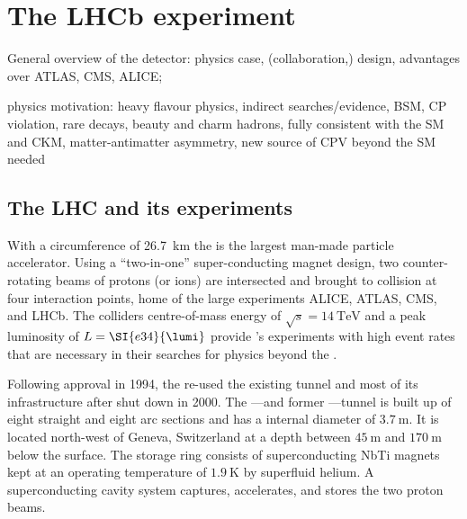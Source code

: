 
\chapter{The \acs*{LHCb} experiment}
\label{ch:lhcb_experiment}
General overview of the detector: physics case, (collaboration,) design, advantages over ATLAS, CMS, ALICE; 

physics motivation:
heavy flavour physics, indirect searches/evidence, BSM, CP violation, rare decays, beauty and charm hadrons, fully consistent with the SM and CKM, matter-antimatter asymmetry, new source of CPV beyond the SM needed

\section{The \acs*{LHC} and its experiments}
\label{sec:lhcb_experiment:lhc}

With a circumference of \SI{26.7}{\kilo\metre} the \LHC is the largest man-made
particle accelerator. Using a \enquote{two-in-one} super-conducting magnet
design, two counter-rotating beams of protons (or ions) are intersected and
brought to collision at four interaction points, home of the large \LHC
experiments \acs*{ALICE}, \acs*{ATLAS}, \acs*{CMS}, and \acs*{LHCb}. The
colliders centre-of-mass energy of $\sqrt{s}=\SI{14}{\TeV}$ and a peak
luminosity of $L=\SI{e34}{\lumi}$ provide \LHC's experiments with high event
rates that are necessary in their searches for physics beyond the \SM.

Following approval in 1994, the \LHC re-used the existing \LEP tunnel and most
of its infrastructure after \LEP shut down in 2000. The \LHC---and former
\LEP---tunnel is built up of eight straight and eight arc sections and has a
internal diameter of $\SI{3.7}{\metre}$. It is located north-west of Geneva,
Switzerland at a depth between $\SI{45}{\metre}$ and $\SI{170}{\metre}$ below
the surface. The storage ring consists of superconducting NbTi magnets kept at
an operating temperature of $\SI{1.9}{\kelvin}$ by superfluid helium. A
superconducting \RF cavity system captures, accelerates, and stores the two
proton beams.

